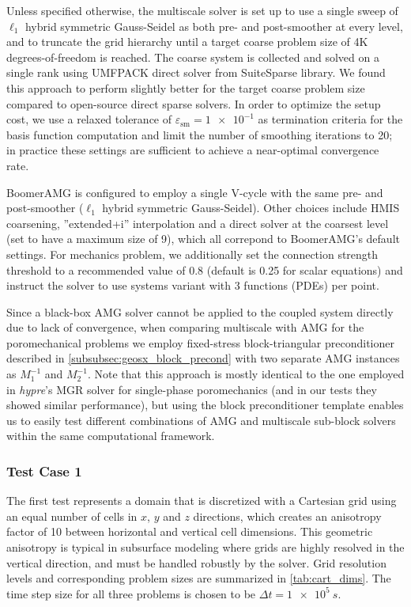 Unless specified otherwise, the multiscale solver is set up to use a single sweep of $\ell_1$ hybrid symmetric Gauss-Seidel as both pre- and post-smoother at every level, and to truncate the grid hierarchy until a target coarse problem size of 4K degrees-of-freedom is reached.   The coarse system is collected and solved on a single rank using UMFPACK direct solver from SuiteSparse library.   We found this approach to perform slightly better for the target coarse problem size compared to open-source direct sparse solvers.   In order to optimize the setup cost, we use a relaxed tolerance of $\varepsilon_{\text{sm}} = \num{1e-1}$ as termination criteria for the basis function computation and limit the number of smoothing iterations to 20; in practice these settings are sufficient to achieve a near-optimal convergence rate.

BoomerAMG is configured to employ a single V-cycle with the same pre- and post-smoother ($\ell_1$ hybrid symmetric Gauss-Seidel).   Other choices include HMIS coarsening, ''extended+i'' interpolation and a direct solver at the coarsest level (set to have a maximum size of 9), which all correpond to BoomerAMG's default settings.   For mechanics problem, we additionally set the connection strength threshold to a recommended value of 0.8 (default is 0.25 for scalar equations) and instruct the solver to use systems variant with 3 functions (PDEs) per point.

Since a black-box AMG solver cannot be applied to the coupled system directly due to lack of convergence, when comparing multiscale with AMG for the poromechanical problems we employ fixed-stress block-triangular preconditioner described in \cref{subsubsec:geosx_block_precond} with two separate AMG instances as $M_1^{-1}$ and $M_2^{-1}$.   Note that this approach is mostly identical to the one employed in \textit{hypre}'s MGR solver \cite{Bui2020} for single-phase poromechanics (and in our tests they showed similar performance), but using the block preconditioner template enables us to easily test different combinations of AMG and multiscale sub-block solvers within the same computational framework.

\subsubsection{Test Case 1}

The first test represents a  domain that is discretized with a Cartesian grid using an equal number of cells in $x$, $y$ and $z$ directions, which creates an anisotropy factor of 10 between horizontal and vertical cell dimensions.   This geometric anisotropy is typical in subsurface modeling where grids are highly resolved in the vertical direction, and must be handled robustly by the solver.   Grid resolution levels and corresponding problem sizes are summarized in \cref{tab:cart_dims}.   The time step size for all three problems is chosen to be $\Delta t = \qty{1e5}{s}$.

